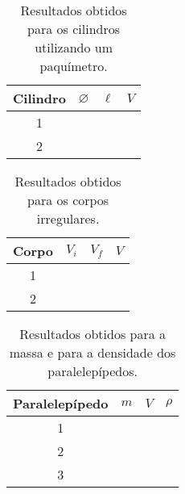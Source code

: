 \begin{table*}[!htpb]
	\label{TabelaDadosPaquimetroCil}
	\begin{center}
	\begin{tabular}{cp{25mm}p{25mm}p{25mm}}
		\toprule
		Cilindro & $\diameter$ & $\ell$ & $V$  \\
		\midrule
		\cellcolor[gray]{0.89}1 & \cellcolor[gray]{0.92} & \cellcolor[gray]{0.89} & \cellcolor[gray]{0.92} \\
		\cellcolor[gray]{0.95}2 & \cellcolor[gray]{0.97} & \cellcolor[gray]{0.95} & \cellcolor[gray]{0.97} \\
		\bottomrule
	\end{tabular}
	\end{center}
	\caption{Resultados obtidos para os cilindros utilizando um paquímetro.}
\end{table*}

\begin{table*}[!htpb]
	\label{TabelaDadosProveta}
	\begin{center}
	\begin{tabular}{cp{25mm}p{25mm}p{25mm}}
		\toprule
		Corpo & $V_i$ & $V_f$ & $V$ \\
		\midrule
		\cellcolor[gray]{0.89}1 & \cellcolor[gray]{0.92} & \cellcolor[gray]{0.89} & \cellcolor[gray]{0.92} \\
		\cellcolor[gray]{0.95}2 & \cellcolor[gray]{0.97} & \cellcolor[gray]{0.95} & \cellcolor[gray]{0.97} \\
		\bottomrule
	\end{tabular}
	\end{center}
	\caption{Resultados obtidos para os corpos irregulares.}
\end{table*}

\begin{table*}[!htpb]
	\label{TabelaDadosMassa}
	\begin{center}
	\begin{tabular}{cp{25mm}p{25mm}p{25mm}}
		\toprule
		Paralelepípedo & $m$ & $V$ & $\rho$ \\
		\midrule
		\cellcolor[gray]{0.89}1 & \cellcolor[gray]{0.92} & \cellcolor[gray]{0.89} & \cellcolor[gray]{0.92} \\
		\cellcolor[gray]{0.95}2 & \cellcolor[gray]{0.97} & \cellcolor[gray]{0.95} & \cellcolor[gray]{0.97} \\
		\cellcolor[gray]{0.89}3 & \cellcolor[gray]{0.92} & \cellcolor[gray]{0.89} & \cellcolor[gray]{0.92} \\
		\bottomrule
	\end{tabular}
	\end{center}
	\caption{Resultados obtidos para a massa e para a densidade dos paralelepípedos.}
\end{table*}

